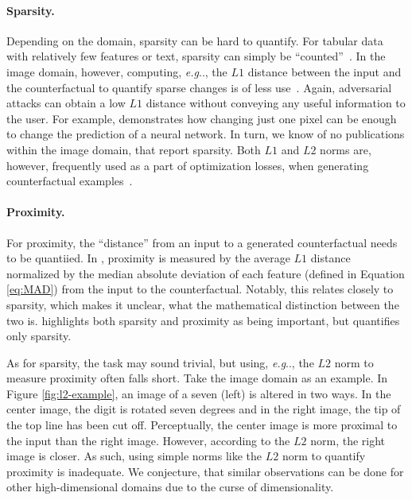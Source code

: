 \documentclass[11pt,a4paper,twoside,openright,final]{memoir}
\makeatletter
\DeclareRobustCommand\onedot{\futurelet\@let@token\@onedot}
\def\@onedot{\ifx\@let@token.\else.\null\fi\xspace}
\def\eg{\emph{e.g}\onedot} \def\Eg{\emph{E.g}\onedot}
\makeatother
\begin{document}
\paragraph{Sparsity.}
Depending on the domain, sparsity can be hard to quantify.
For tabular data with relatively few features or text, sparsity can simply be ``counted''~\cite{Kang2020, Laugel2018}. 
In the image domain, however, computing, \eg, the $L1$ distance between the input and the counterfactual to quantify sparse changes is of less use~\cite{Kang2020}. 
Again, adversarial attacks can obtain a low $L1$ distance without conveying any useful information to the user.
For example, \cite{one-pixel-attack} demonstrates how changing just one pixel can be enough to change the prediction of a neural network.
In turn, we know of no publications within the image domain, that report sparsity.
Both $L1$ and $L2$ norms are, however, frequently used as a part of optimization losses, when generating counterfactual examples~\cite{VanLooveren2019, Dhurandhar2018, Wachter2017, Joshi2018, Singla2019}. 

\paragraph{Proximity.}
For proximity, the ``distance'' from an input to a generated counterfactual needs to be quantiied.
In \cite{Mothilal2020}, proximity is measured by the average $L1$ distance normalized by the median absolute deviation of each feature (defined in Equation \ref{eq:MAD}) from the input to the counterfactual. 
Notably, this relates closely to sparsity, which makes it unclear, what the mathematical distinction between the two is.
\cite{Mothilal2020} highlights both sparsity and proximity as being important, but quantifies only sparsity.

As for sparsity, the task may sound trivial, but using, \eg, the $L2$ norm to measure proximity often falls short.
Take the image domain as an example.
In Figure \ref{fig:l2-example}, an image of a seven (left) is altered in two ways. 
In the center image, the digit is rotated seven degrees and in the right image, the tip of the top line has been cut off.
Perceptually, the center image is more proximal to the input than the right image.
However, according to the $L2$ norm, the right image is closer.
As such, using simple norms like the $L2$ norm to quantify proximity is inadequate.
We conjecture, that similar observations can be done for other high-dimensional domains due to the curse of dimensionality.
\end{document}
